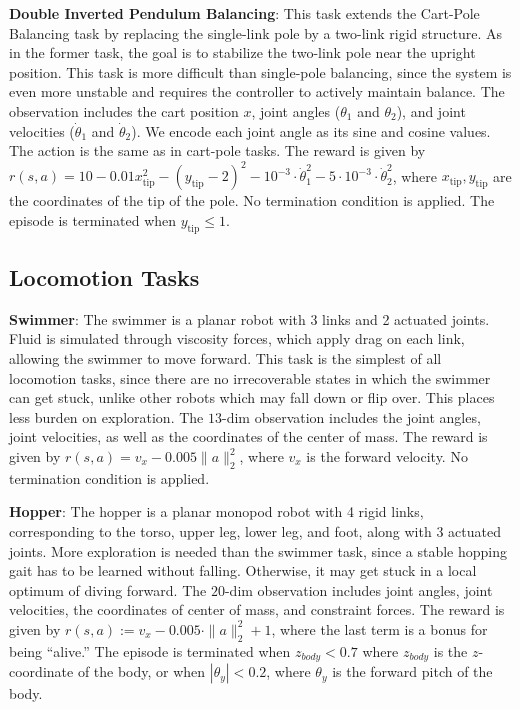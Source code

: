 \documentclass{article}
\newcommand{\norm}[1]{\|#1\|}\clearpage{}
\begin{document}
{\bf Double Inverted Pendulum Balancing}: This task extends the Cart-Pole Balancing task by replacing the single-link pole by a two-link rigid structure. As in the former task, the goal is to stabilize the two-link pole near the upright position. This task is more difficult than single-pole balancing, since the system is even more unstable and requires the controller to actively maintain balance. The observation includes the cart position $x$, joint angles ($\theta_1$ and $\theta_2$), and joint velocities ($\dot\theta_1$ and $\dot\theta_2$). We encode each joint angle as its sine and cosine values. The action is the same as in cart-pole tasks. The reward is given by $r(s, a) = 10 - 0.01 x_{\mathrm{tip}}^2 - (y_{\mathrm{tip}} - 2)^2 - 10^{-3} \cdot \dot\theta_1^2 - 5\cdot 10^{-3} \cdot \dot\theta_2^2$, where $x_{\mathrm{tip}}, y_{\mathrm{tip}}$ are the coordinates of the tip of the pole.
No termination condition is applied. The episode is terminated when $y_{\text{tip}} \leq 1$.

\subsection{Locomotion Tasks}

{\bf Swimmer}: The swimmer is a planar robot with 3 links and 2 actuated joints. Fluid is simulated through viscosity forces, which apply drag on each link, allowing the swimmer to move forward. This task is the simplest of all locomotion tasks, since there are no irrecoverable states in which the swimmer can get stuck, unlike other robots which may fall down or flip over. This places less burden on exploration. The $13$-dim observation includes the joint angles, joint velocities, as well as the coordinates of the center of mass. The reward is given by $r(s, a) = v_x - 0.005 \norm{a}_2^2$, where $v_x$ is the forward velocity. No termination condition is applied.


{\bf Hopper}: The hopper is a planar monopod robot with 4 rigid links, corresponding to the torso, upper leg, lower leg, and foot, along with 3 actuated joints. More exploration is needed than the swimmer task, since a stable hopping gait has to be learned without falling. Otherwise, it may get stuck in a local optimum of diving forward. The $20$-dim observation includes joint angles, joint velocities, the coordinates of center of mass, and constraint forces. The reward is given by
$r(s, a) := v_x - 0.005 \cdot \norm{a}_2^2 + 1$,
where the last term is a bonus for being ``alive.'' The episode is terminated when $z_{body} < 0.7$ where $z_{body}$ is the $z$-coordinate of the body, or when $|\theta_y| < 0.2$, where $\theta_y$ is the forward pitch of the body.
\end{document}

